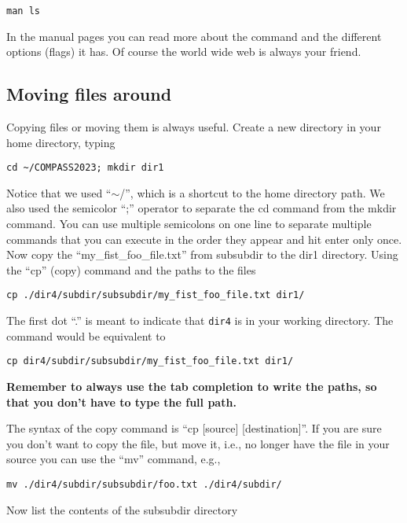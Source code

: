 \documentclass[aps,showpacs,prd,notitlepage,preprintnumbers,amsmath,amssymb,letterpaper]{revtex4}
\begin{document}
\begin{verbatim}
man ls
\end{verbatim}

In the manual pages you can read more about the command and the
different options (flags) it has. Of course the world wide web is always
your friend.

\subsection{Moving files around}

Copying files or moving them is always useful. Create a new directory in your home directory, typing

\begin{verbatim}
cd ~/COMPASS2023; mkdir dir1
\end{verbatim}

Notice that we used ``$\sim$/'', which is a shortcut to the home
directory path. We also used the semicolor ``;'' operator to separate
the cd command from the mkdir command. You can use multiple semicolons
on one line to separate multiple commands that you can execute in the
order they appear and hit enter only once. Now copy the
``my\_fist\_foo\_file.txt'' from subsubdir to the dir1
directory. Using the ``cp'' (copy) command and the paths to the files

\begin{verbatim}
cp ./dir4/subdir/subsubdir/my_fist_foo_file.txt dir1/
\end{verbatim}

The first dot ``.'' is meant to indicate that {\tt dir4} is in your working directory.
The command would be equivalent to

\begin{verbatim}
cp dir4/subdir/subsubdir/my_fist_foo_file.txt dir1/
\end{verbatim}


{\bf Remember to always use the tab completion to write the paths, so
  that you don't have to type the full path.}


The syntax of the copy command is ``cp [source] [destination]''. If you are sure
you don't want to copy the file, but move it, i.e., no longer have the file
in your source you can use the ``mv'' command, e.g.,

\begin{verbatim}
mv ./dir4/subdir/subsubdir/foo.txt ./dir4/subdir/
\end{verbatim}

Now list the contents of the subsubdir directory
\end{document}
